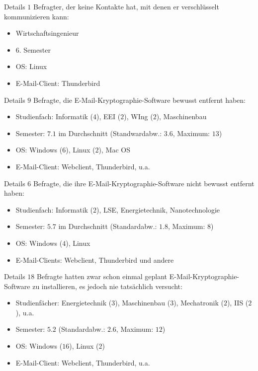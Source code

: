 \documentclass[]{beamer}
\begin{document}
\begin{frame}{Details}
	$1$ Befragter, der keine Kontakte hat, mit denen er verschlüsselt kommunizieren kann:
	\begin{itemize}
		\item Wirtschaftsingenieur
		\item $6.$ Semester
		\item OS: Linux
		\item E-Mail-Client: Thunderbird
	\end{itemize}
\end{frame}

\begin{frame}{Details}
	$9$ Befragte, die E-Mail-Kryptographie-Software bewusst entfernt haben:
\begin{itemize}
	\item Studienfach: Informatik ($4$), EEI ($2$), WIng ($2$), Maschinenbau
	\item Semester: $7.1$ im Durchschnitt (Standwardabw.: $3.6$, Maximum: $13$)
	\item OS: Windows ($6$), Linux ($2$), Mac OS
	\item E-Mail-Client: Webclient, Thunderbird, u.a.
\end{itemize}
\end{frame}

\begin{frame}{Details}
	$6$ Befragte, die ihre E-Mail-Kryptographie-Software nicht bewusst entfernt haben:
	\begin{itemize}
		\item Studienfach: Informatik ($2$), LSE, Energietechnik, Nanotechnologie
		\item Semester: $5.7$ im Durchschnitt (Standardabw.: $1.8$, Maximum: $8$)
		\item OS: Windows ($4$), Linux
		\item E-Mail-Clients: Webclient, Thunderbird und andere
	\end{itemize}
\end{frame}

\begin{frame}{Details}
	$18$ Befragte hatten zwar schon einmal geplant E-Mail-Kryptographie-Software zu installieren, es jedoch nie tatsächlich versucht:
	\begin{itemize}
		\item Studienfächer: Energietechnik ($3$), Maschinenbau ($3$), Mechatronik ($2$), IIS ($2$), u.a.
		\item Semester: $5.2$ (Standardabw.: $2.6$, Maximum: $12$)
		\item OS: Windows ($16$), Linux ($2$)
		\item E-Mail-Client: Webclient, Thunderbird, u.a.
	\end{itemize}
\end{frame}
\end{document}
